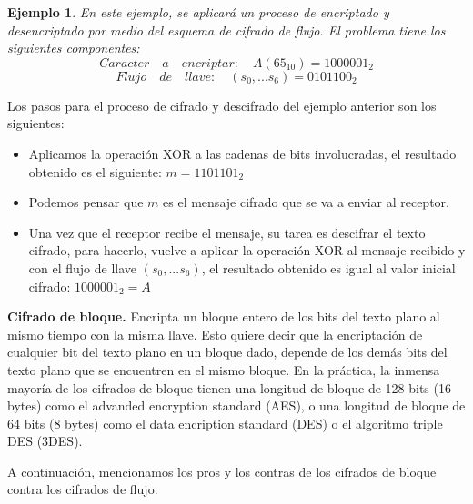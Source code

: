 \documentclass{llncs}
\theoremstyle{plane}
\newtheorem{ej}{Ejemplo}
\begin{document}
\begin{ej}
En este ejemplo, se aplicará un proceso de encriptado y desencriptado por medio del esquema de cifrado de flujo.
El problema tiene los siguientes componentes:
\[
Caracter \quad  a \quad   encriptar: \quad   A (65_{10})  = 1000001_{2}
\]
\[
Flujo \quad   de  \quad  llave: \quad   (s_{0},...s_{6})   = 0101100_{2}
\]
\end{ej}

Los pasos para el proceso de cifrado y descifrado del ejemplo anterior son los siguientes:

\begin{itemize}
\item Aplicamos la operación XOR a las cadenas de bits involucradas, el resultado obtenido es el siguiente: $ m =1101101_{2}$

\item Podemos pensar que $m$ es el mensaje cifrado que se va a enviar al receptor.
\item Una vez que el receptor recibe el mensaje, su tarea es descifrar el texto cifrado, para hacerlo, vuelve a aplicar la operación XOR al mensaje recibido y con el flujo de llave  $(s_{0},...s_{6})$, el resultado obtenido es igual al valor inicial cifrado: $1000001_{2}=A$ 
\end{itemize}


\textbf{Cifrado de bloque.} Encripta un bloque entero de los bits del texto plano al mismo tiempo con la misma llave. Esto quiere decir que la encriptación de cualquier bit del texto plano en un bloque dado, depende de los demás bits del texto plano que se encuentren en el mismo bloque. En la práctica, la inmensa mayoría de los cifrados de bloque tienen una longitud de bloque de 128 bits (16 bytes) como el advanded encryption standard (AES), o una longitud de bloque de 64 bits (8 bytes) como el data encription standard (DES) o el algoritmo triple DES (3DES).

A continuación, mencionamos los pros y los contras de los cifrados de bloque contra los cifrados de flujo. 
\end{document}
